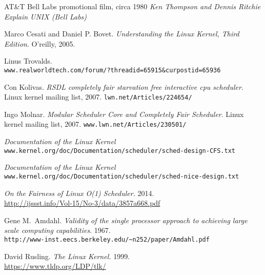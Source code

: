 \documentclass[10pt, oneside]{book}
\begin{document}
\frontmatter

\begin{titlepage}

\end{titlepage}


\tableofcontents
\listoffigures



\mainmatter







\begin{thebibliography}{}
AT\&T Bell Labs promotional film, circa 1980
\textit{Ken Thompson and Dennis Ritchie Explain UNIX (Bell Labs)} %

Marco Cesati and Daniel P. Bovet.
\textit{Understanding the Linux Kernel, Third Edition}.
O'reilly, 2005.

Linus Trovalds.\\
\texttt{www.realworldtech.com/forum/?threadid=65915\&curpostid=65936}

Con Kolivas.
\textit{RSDL completely fair starvation free interactive cpu scheduler}.
Linux kernel mailing list, 2007.
\texttt{lwn.net/Articles/224654/}

Ingo Molnar.
\textit{Modular Scheduler Core and Completely Fair Scheduler}.
Linux kernel mailing list, 2007. 
\texttt{www.lwn.net/Articles/230501/}

\textit{Documentation of the Linux Kernel}\\
\texttt{www.kernel.org/doc/Documentation/scheduler/sched-design-CFS.txt}

\textit{Documentation of the Linux Kernel}\\
\texttt{www.kernel.org/doc/Documentation/scheduler/sched-nice-design.txt}

\textit{On the Fairness of Linux O(1) Scheduler.} 2014.\\
\url{http://ijssst.info/Vol-15/No-3/data/3857a668.pdf}

Gene M.\ Amdahl.
\textit{Validity of the single processor approach to achieving large scale
computing capabilities}.
1967.\\
\texttt{http://www-inst.eecs.berkeley.edu/\textasciitilde n252/paper/Amdahl.pdf}

David Rusling.
\textit{The Linux Kernel.}
1999.\\
\url{https://www.tldp.org/LDP/tlk/}
\end{thebibliography}
\end{document}
